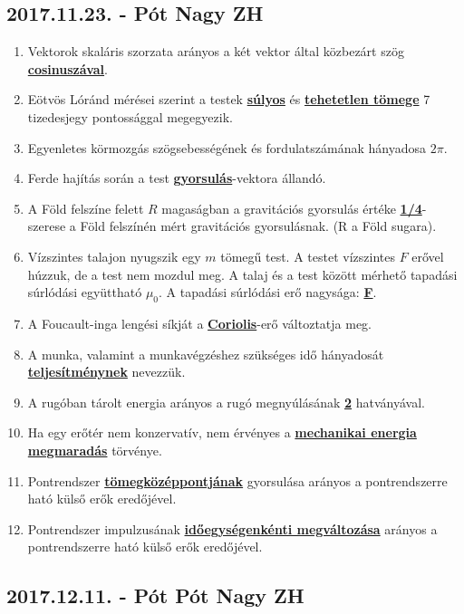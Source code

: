 \documentclass[../../fizika_kerdesek.tex]{subfiles}
\begin{document}
    \subsection{2017.11.23. - Pót Nagy ZH}

        \begin{enumerate}
            \item Vektorok skaláris szorzata arányos a két vektor által közbezárt szög \underline{\textbf{cosinuszával}}.
            \item Eötvös Lóránd mérései szerint a testek \underline{\textbf{súlyos}} és \underline{\textbf{tehetetlen tömege}} 7 tizedesjegy pontossággal megegyezik.
            \item Egyenletes körmozgás szögsebességének és fordulatszámának hányadosa \textbf{\underline{$2\pi$}}.
            \item Ferde hajítás során a test \underline{\textbf{gyorsulás}}-vektora állandó.
            \item A Föld felszíne felett $R$ magaságban a gravitációs gyorsulás értéke \underline{\textbf{1/4}}-szerese a Föld felszínén mért gravitációs gyorsulásnak. (R a Föld sugara).
            \item Vízszintes talajon nyugszik egy $m$ tömegű test. A testet vízszintes $F$ erővel húzzuk, de a test nem mozdul meg. A talaj és a test között mérhető tapadási súrlódási együttható $\mu_0$. A tapadási súrlódási erő nagysága: \underline{\textbf{F}}.
            \item A Foucault-inga lengési síkját a \underline{\textbf{Coriolis}}-erő változtatja meg. 
            \item A munka, valamint a munkavégzéshez szükséges idő hányadosát \underline{\textbf{teljesítménynek}} nevezzük.
            \item A rugóban tárolt energia arányos a rugó megnyúlásának \underline{\textbf{2}} hatványával.
            \item Ha egy erőtér nem konzervatív, nem érvényes a \underline{\textbf{mechanikai energia megmaradás}} törvénye. 
            \item Pontrendszer \underline{\textbf{tömegközéppontjának}} gyorsulása arányos a pontrendszerre ható külső erők eredőjével.
            \item Pontrendszer impulzusának \underline{\textbf{időegységenkénti megváltozása}} arányos a pontrendszerre ható külső erők eredőjével.
        \end{enumerate}

    \subsection{2017.12.11. - Pót Pót Nagy ZH}
\end{document}
